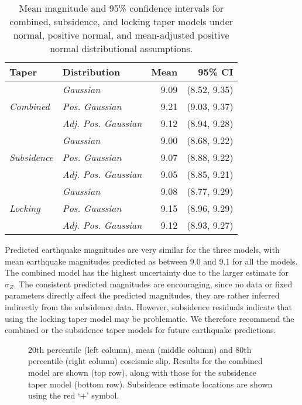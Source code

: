 {\begin{table}[ht]
\centering
\begin{tabular}{llrr}
  \hline
Taper & Distribution & Mean & 95\% CI \\ 
  \hline
\multirow{3}{*}{\textit{Combined}} & \textit{Gaussian} & 9.09 & (8.52, 9.35) \\ 
&   \textit{Pos. Gaussian} & 9.21 & (9.03, 9.37) \\ 
 &  \textit{Adj. Pos. Gaussian} & 9.12 & (8.94, 9.28) \\ 
 \hline
\multirow{3}{*}{\textit{Subsidence}}  & \textit{Gaussian} & 9.00 & (8.68, 9.22) \\ 
  & \textit{Pos. Gaussian} & 9.07 & (8.88, 9.22) \\ 
  & \textit{Adj. Pos. Gaussian} & 9.05 & (8.85, 9.21) \\ 
  \hline
\multirow{3}{*}{\textit{Locking}} & \textit{Gaussian} & 9.08 & (8.77, 9.29) \\ 
  & \textit{Pos. Gaussian} & 9.15 & (8.96, 9.29) \\ 
  & \textit{Adj. Pos. Gaussian} & 9.12 & (8.93, 9.27) \\ 
   \hline
\end{tabular}
\caption{Mean magnitude and 95\% confidence intervals for combined, subsidence, and locking taper models under normal, positive normal, and mean-adjusted positive normal distributional assumptions.}
\label{margMags}
\end{table}

Predicted earthquake magnitudes are very similar for the three models, with mean earthquake magnitudes predicted as between 9.0 and 9.1 for all the models.  The combined model has the highest uncertainty due to the larger estimate for $\sigma_Z$.  The consistent predicted magnitudes are encouraging, since no data or fixed parameters directly affect the predicted magnitudes, they are rather inferred indirectly from the subsidence data.  However, subsidence residuals indicate that using the locking taper model may be problematic.  We therefore recommend the combined or the subsidence taper models for future earthquake predictions.

\begin{figure}
\centering
{}
\caption{20th percentile (left column), mean (middle column) and 80th percentile (right column) coseismic slip.  Results for the combined model are shown (top row), along with those for the subsidence taper model (bottom row).  Subsidence estimate locations are shown using the red `+' symbol.}
\label{modelSummary}
\end{figure}

}
